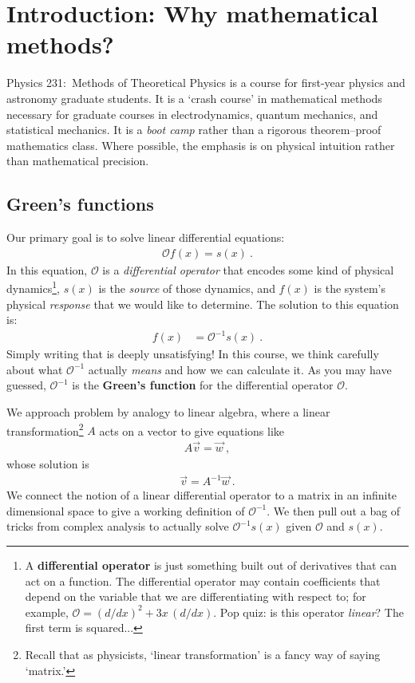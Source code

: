 
\section{Introduction: Why mathematical methods?}

Physics 231:~Methods of Theoretical Physics is a course for first-year physics and astronomy graduate students. It is a `crash course’ in mathematical methods necessary for graduate courses in electrodynamics, quantum mechanics, and statistical mechanics. It is a \emph{boot camp} rather than a rigorous theorem--proof mathematics class. Where possible, the emphasis is on physical intuition rather than mathematical precision. 

\subsection{Green’s functions}

Our primary goal is to solve linear differential equations:
\begin{align}
  \mathcal O f(x) = s(x) \ .
  \label{eq:greens:function:equation}
\end{align}
In this equation, $\mathcal O$ is a \emph{differential operator} that encodes some kind of physical dynamics\footnote{A \textbf{differential operator} is just something built out of derivatives that can act on a function. The differential operator may contain coefficients that depend on the variable that we are differentiating with respect to; for example, $\mathcal O = (d/dx)^2 + 3x\,(d/dx)$. Pop quiz: is this operator \emph{linear}? The first term is squared...}, $s(x)$ is the \emph{source} of those dynamics, and $f(x)$ is the system's physical \emph{response} that we would like to determine. The solution to this equation is:
\begin{align}
  f(x) &= \mathcal O^{-1} s(x) \ .
\end{align}
Simply writing that is deeply unsatisfying! %
In this course, we think carefully about what $\mathcal O^{-1}$ actually \emph{means} and how we can calculate it. As you may have guessed, $\mathcal O^{-1}$ is the \textbf{Green's function} for the differential operator $\mathcal O$. 

We approach problem by analogy to linear algebra, where a linear transformation\footnote{Recall that as physicists, `linear transformation' is a fancy way of saying `matrix.'} $A$ acts on a vector to give equations like
\begin{align}
  A \vec{v} = \vec{w} \ ,
\end{align}
whose solution is
\begin{align}
  \vec{v} = A^{-1} \vec{w} \ .
\end{align}
We connect the notion of a linear differential operator to a matrix in an infinite dimensional space to give a working definition of $\mathcal O^{-1}$. We then pull out a bag of tricks from complex analysis to actually solve $\mathcal O^{-1}s(x)$ given $\mathcal O$ and $s(x)$. 

